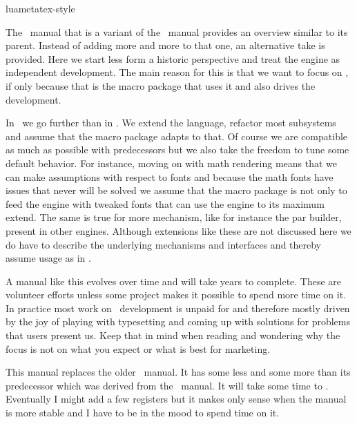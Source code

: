 
\environment luametatex-style

\startdocument[title=Introduction]

The \LUAMETATEX\ manual that is a variant of the \LUATEX\ manual provides an
overview similar to its parent. Instead of adding more and more to that one, an
alternative take is provided. Here we start less form a historic perspective and
treat the engine as independent development. The main reason for this is that we
want to focus on \CONTEXT, if only because that is the macro package that uses it
and also drives the development.

In \LUAMETATEX\ we go further than in \LUATEX. We extend the language, refactor
most subsystems and assume that the macro package adapts to that. Of course we
are compatible as much as possible with predecessors but we also take the freedom
to tune some default behavior. For instance, moving on with math rendering means
that we can make assumptions with respect to fonts and because the math fonts
have issues that never will be solved we assume that the macro package is not
only to feed the engine with tweaked fonts that can use the engine to its maximum
extend. The same is true for more mechanism, like for instance the par builder,
present in other engines. Although extensions like these are not discussed here we
do have to describe the underlying mechanisms and interfaces and thereby assume
usage as in \CONTEXT.

A manual like this evolves over time and will take years to complete. These are
volunteer efforts unless some project makes it possible to spend more time on it.
In practice most work on \TEX\ development is unpaid for and therefore mostly
driven by the joy of playing with typesetting and coming up with solutions for
problems that users present us. Keep that in mind when reading and wondering why
the focus is not on what you expect or what is best for marketing.

This manual replaces the older \LUAMETATEX\ manual. It has some less and some
more than its predecessor which was derived from the \LUATEX\ manual. It will
take some time to . Eventually I might add a few registers but
it makes only sense when the manual is more stable and I have to be in the mood
to spend time on it.

\start \switchtobodyfont[small] \setupinterlinespace

